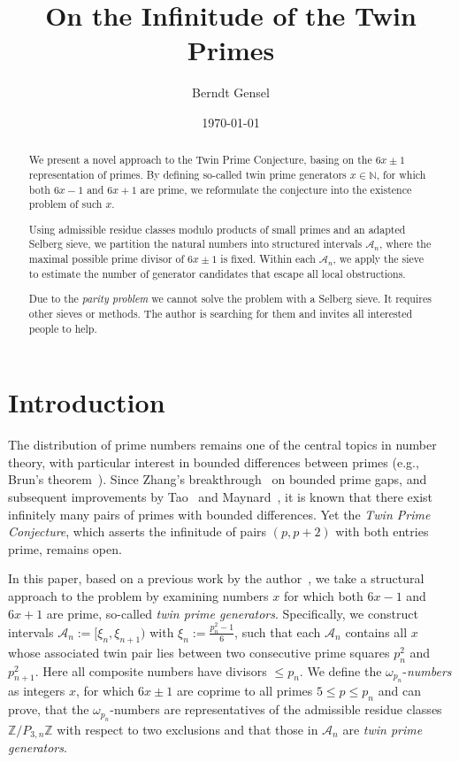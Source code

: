 \documentclass[fmeq,reqno]{amsart}
\theoremstyle{definition}
\theoremstyle{remark}
\numberwithin{equation}{section}
\newcommand{\N}{\mathbb{N}}
\newcommand{\mc}[1]{\mathcal{#1}}
\newcommand{\om}[1]{$\omega_{#1}$}
\begin{document}
\title{On the Infinitude of the Twin Primes}

\author{Berndt Gensel}
\address{Prof. Dr. B. Gensel, Spittal on Drau, Austria}


\date{\today}

\maketitle

\begin{abstract}
We present a novel approach to the Twin Prime Conjecture, basing on the $6x \pm 1$ representation of primes. By defining so-called twin prime generators $x \in \N$, for which both $6x - 1$ and $6x + 1$ are prime, we reformulate the conjecture into the existence problem of such $x$.

Using admissible residue classes modulo products of small primes and an adapted Selberg sieve, we partition the natural numbers into structured intervals $\mc{A}_n$, where the maximal possible prime divisor of $6x \pm 1$ is fixed. Within each $\mc{A}_n$, we apply the sieve to estimate the number of generator candidates that escape all local obstructions.

Due to the \emph{parity problem} we cannot solve the problem with a Selberg sieve. It requires other sieves or methods. The author is searching for them and invites all interested people to help.
\end{abstract}

\section{Introduction}
The distribution of prime numbers remains one of the central topics in number theory, with particular interest in bounded differences between primes (e.g., Brun’s theorem~\cite{brun}). Since Zhang’s breakthrough~\cite{zhang} on bounded prime gaps, and subsequent improvements by Tao~\cite{tao} and Maynard~\cite{maynard}, it is known that there exist infinitely many pairs of primes with bounded differences. Yet the \emph{Twin Prime Conjecture}, which asserts the infinitude of pairs $(p, p+2)$ with both entries prime, remains open.

In this paper, based on a previous work by the author~\cite{gensel}, we take a structural approach to the problem by examining numbers $x$ for which both $6x - 1$ and $6x + 1$ are prime, so-called \emph{twin prime generators}. Specifically, we construct intervals $\mc{A}_n := [\xi_n, \xi_{n+1})$ with $\xi_n := \frac{p_n^2 - 1}{6}$, such that each $\mc{A}_n$ contains all $x$ whose associated twin pair lies between two consecutive prime squares $p_n^2$ and $p_{n+1}^2$. Here all composite numbers have divisors $\le p_n$.
We define the \om{p_n}-\emph{numbers} as integers $x$, for which $6x\pm 1$ are coprime to all primes $5\le p \le p_n$ and can prove, 
that the \om{p_n}-numbers are representatives of the admissible residue classes $\mathbb{Z} / P_{3,n} \mathbb{Z}$ with respect to two exclusions and
that those in $\mc{A}_n$ are \emph{twin prime generators}.
\end{document}
